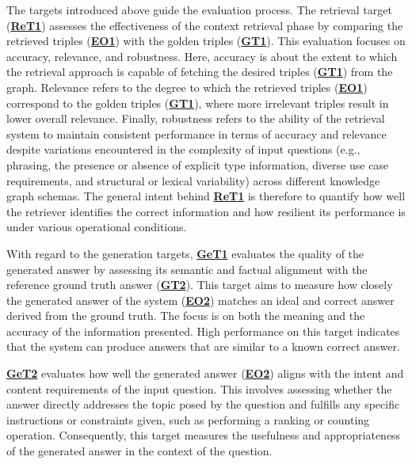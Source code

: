 The targets introduced above guide the evaluation process. The retrieval target (\hyperref[enum:get1]{\textbf{ReT1}}) assesses the effectiveness of the context retrieval phase by comparing the retrieved triples (\hyperref[enum:eo1]{\textbf{EO1}}) with the golden triples (\hyperref[enum:gt1]{\textbf{GT1}}). This evaluation focuses on accuracy, relevance, and robustness. Here, accuracy is about the extent to which the retrieval approach is capable of fetching the desired triples (\hyperref[enum:get1]{\textbf{GT1}}) from the graph. Relevance refers to the degree to which the retrieved triples (\hyperref[enum:get1]{\textbf{EO1}}) correspond to the golden triples (\hyperref[enum:get1]{\textbf{GT1}}), where more irrelevant triples result in lower overall relevance. Finally, robustness refers to the ability of the retrieval system to maintain consistent performance in terms of accuracy and relevance despite variations encountered in the complexity of input questions (e.g., phrasing, the presence or absence of explicit type information, diverse use case requirements, and structural or lexical variability) across different knowledge graph schemas. The general intent behind \hyperref[enum:get1]{\textbf{ReT1}} is therefore to quantify how well the retriever identifies the correct information and how resilient its performance is under various operational conditions.

With regard to the generation targets, \hyperref[enum:get1]{\textbf{GeT1}} evaluates the quality of the generated answer by assessing its semantic and factual alignment with the reference ground truth answer (\hyperref[enum:get1]{\textbf{GT2}}). This target aims to measure how closely the generated answer of the system (\hyperref[enum:get1]{\textbf{EO2}}) matches an ideal and correct answer derived from the ground truth. The focus is on both the meaning and the accuracy of the information presented. High performance on this target indicates that the system can produce answers that are similar to a known correct answer.

\hyperref[enum:get2]{\textbf{GeT2}} evaluates how well the generated answer (\hyperref[enum:get1]{\textbf{EO2}}) aligns with the intent and content requirements of the input question. This involves assessing whether the answer directly addresses the topic posed by the question and fulfills any specific instructions or constraints given, such as performing a ranking or counting operation. Consequently, this target measures the usefulness and appropriateness of the generated answer in the context of the question.


